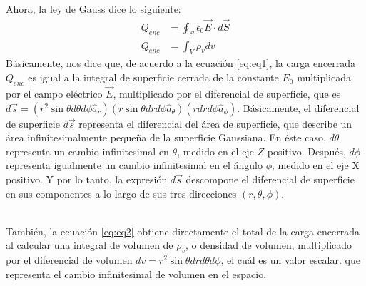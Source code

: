 \documentclass[12pt, letterpaper]{report}
\begin{document}
Ahora, la ley de Gauss dice lo siguiente: 
\begin{align}
Q_{enc} &= \oint_S \epsilon_0\vec{E}\cdot d\vec{S} \label{eq:eq1}\\
Q_{enc} &= \int_V \rho_v dv\label{eq:eq2}
\end{align}
Básicamente, nos dice que, de acuerdo a la ecuación \ref{eq:eq1}, la carga encerrada $Q_{enc}$ es igual a la integral de superficie 
cerrada de la constante $E_0$ multiplicada por el campo eléctrico $\vec{E}$, multiplicado por el diferencial de superficie, que es 
$d\vec{s} = (r^2\sin \theta d \theta d \phi \hat{a}_r)(r\sin \theta dr d\phi \hat{a}_\theta)(rdrd\phi \hat{a}_\phi)$. Básicamente, el diferencial 
de superficie $d\vec{s}$ representa el diferencial del área de superficie, que describe un área infinitesimalmente pequeña de la superficie Gaussiana. 
En éste caso, $d\theta$ representa un cambio infinitesimal en $\theta$, medido en el eje $Z$ positivo. Después, $d\phi$ representa igualmente un 
cambio infinitesimal en el ángulo $\phi$, medido en el eje X positivo. Y por lo tanto, la expresión $d\vec{s}$ descompone el diferencial de superficie en 
sus componentes a lo largo de sus tres direcciones $(r, \theta, \phi)$. \\ 

También, la ecuación \ref{eq:eq2} obtiene directamente el total de la carga encerrada al calcular una integral de volumen de $\rho_v$, o densidad de volumen, 
multiplicado por el diferencial de volumen $dv = r^2\sin \theta dr d\theta d\phi$, el cuál es un valor escalar. que representa el cambio infinitesimal de volumen en el espacio. \\ 
\end{document}
